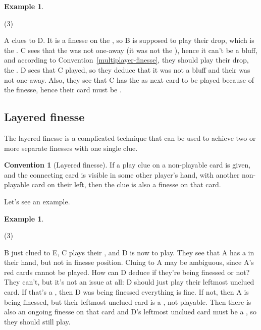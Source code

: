 \documentclass[a4paper]{article}
\theoremstyle{plain}
\theoremstyle{definition}
\newtheorem{example}[theorem]{Example}
\newtheorem{convention}[theorem]{Convention}
\begin{document}
\begin{example}
	\hfill
	\begin{tasks}(3)
		\task[+]      
		\task[A]    
		\task[B]    
		\task[C]    
		\task[D]    
		\task[E]    
	\end{tasks}
	
	A clues  to D. It is a finesse on the , so B is supposed to play their drop, which is the . C sees that the  was not one-away (it was not the ), hence it can't be a bluff, and according to Convention~\ref{multiplayer-finesse}, they should play their drop, the . D sees that C played, so they deduce that it was not a bluff and their  was not one-away. Also, they see that C has the  as next card to be played because of the finesse, hence their card must be .
\end{example}

\subsection{Layered finesse}

The layered finesse is a complicated technique that can be used to achieve two or more separate finesses with one single clue.

\begin{convention}[Layered finesse]
	\label{layered-finesse}
	If a play clue on a non-playable card is given, and the connecting card is visible in some other player's hand, with another non-playable card on their left, then the clue is also a finesse on that card.
\end{convention}

Let's see an example.

\begin{example}
	\hfill	
	\begin{tasks}(3)
		\task[+]      
		\task[A]    
		\task[B]    
		\task[C]    
		\task[D]    
		\task[E]    
	\end{tasks}
	
	B just clued  to E, C plays their , and D is now to play. They see that A has a  in their hand, but not in finesse position. Cluing  to A may be ambiguous, since A's red cards cannot be played. How can D deduce if they're being finessed or not? They can't, but it's not an issue at all: D should just play their leftmost unclued card. If that's a , then D was being finessed everything is fine. If not, then A is being finessed, but their leftmost unclued card is a , not playable. Then there is also an ongoing finesse on that card and D's leftmost unclued card must be a , so they should still play.	
\end{example}
\end{document}
